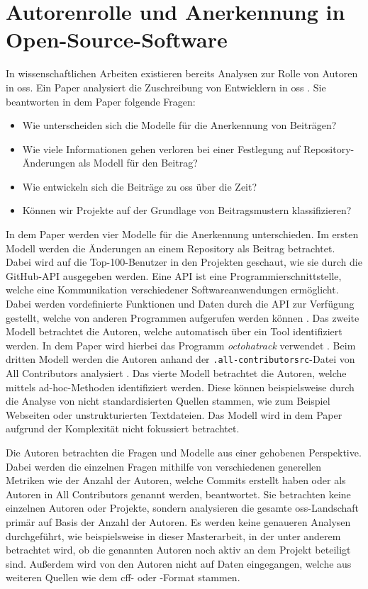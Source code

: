 \section{Autorenrolle und Anerkennung in Open-Source-Software}
\label{sec:autorenrolle-oss}
In wissenschaftlichen Arbeiten existieren bereits Analysen zur Rolle von Autoren in \gls{oss}.
Ein Paper analysiert die Zuschreibung von Entwicklern in \gls{oss} \autocite{young_which_2021}.
Sie beantworten in dem Paper folgende Fragen:

\begin{itemize}
  \item Wie unterscheiden sich die Modelle für die Anerkennung von Beiträgen?
  \item Wie viele Informationen gehen verloren bei einer Festlegung auf Repository-Änderungen als Modell für den Beitrag?
  \item Wie entwickeln sich die Beiträge zu \gls{oss} über die Zeit?
  \item Können wir Projekte auf der Grundlage von Beitragsmustern klassifizieren?
\end{itemize}

In dem Paper werden vier Modelle für die Anerkennung unterschieden.
Im ersten Modell werden die Änderungen an einem Repository als Beitrag betrachtet.
Dabei wird auf die Top-100-Benutzer in den Projekten geschaut, wie sie durch die GitHub-API ausgegeben werden.
Eine API ist eine Programmierschnittstelle, welche eine Kommunikation verschiedener Softwareanwendungen ermöglicht.
Dabei werden vordefinierte Funktionen und Daten durch die API zur Verfügung gestellt, welche von anderen Programmen aufgerufen werden können \autocite{github_about_2022}.
Das zweite Modell betrachtet die Autoren, welche automatisch über ein Tool identifiziert werden.
In dem Paper wird hierbei das Programm \emph{octohatrack} verwendet \autocites{young_which_2021}{mclaughlin_octohatrack_2020}.
Beim dritten Modell werden die Autoren anhand der \texttt{.all-contributorsrc}-Datei von \glqq All Contributors\grqq{} analysiert \autocites{young_which_2021}{bolam_recognize_2024}.
Das vierte Modell betrachtet die Autoren, welche mittels ad-hoc-Methoden identifiziert werden.
Diese können beispielsweise durch die Analyse von nicht standardisierten Quellen stammen, wie zum Beispiel Webseiten oder unstrukturierten Textdateien.
Das Modell wird in dem Paper aufgrund der Komplexität nicht fokussiert betrachtet.

Die Autoren betrachten die Fragen und Modelle aus einer gehobenen Perspektive.
Dabei werden die einzelnen Fragen mithilfe von verschiedenen generellen Metriken wie der Anzahl der Autoren, welche Commits erstellt haben oder als Autoren in \glqq All Contributors\grqq{} genannt werden, beantwortet.
Sie betrachten keine einzelnen Autoren oder Projekte, sondern analysieren die gesamte \gls{oss}-Landschaft primär auf Basis der Anzahl der Autoren.
Es werden keine genaueren Analysen durchgeführt, wie beispielsweise in dieser Masterarbeit, in der unter anderem betrachtet wird, ob die genannten Autoren noch aktiv an dem Projekt beteiligt sind.
Außerdem wird von den Autoren nicht auf Daten eingegangen, welche aus weiteren Quellen wie dem \gls{cff}- oder -Format stammen.
